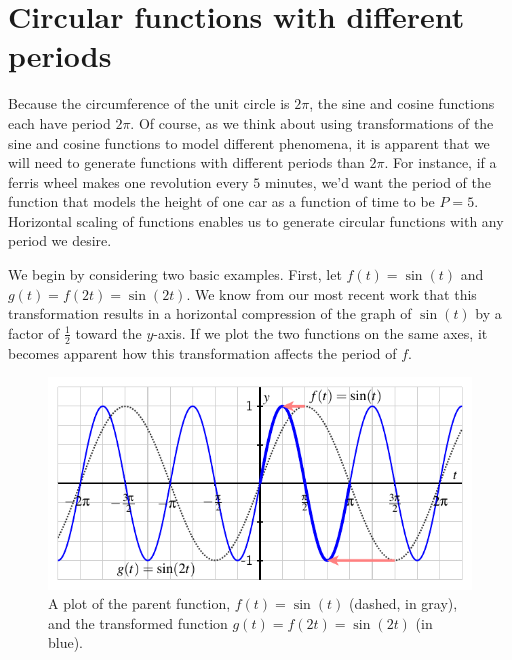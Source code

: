 \documentclass{ximera}
\begin{document}
%
%
%
\section{Circular functions with different periods}

Because the circumference of the unit circle is \(2\pi\), the sine and cosine functions each have period \(2\pi\).  Of course, as we think about using transformations of the sine and cosine functions to model different phenomena, it is apparent that we will need to generate functions with different periods than \(2\pi\).  For instance, if a ferris wheel makes one revolution every \(5\) minutes, we'd want the period of the function that models the height of one car as a function of time to be \(P = 5\).  Horizontal scaling of functions enables us to generate circular functions with any period we desire.%

We begin by considering two basic examples.  First, let \(f(t) = \sin(t)\) and \(g(t) = f(2t) = \sin(2t)\).  We know from our most recent work that this transformation results in a horizontal compression of the graph of \(\sin(t)\) by a factor of \(\frac{1}{2}\) toward the \(y\)-axis.  If we plot the two functions on the same axes, it becomes apparent how this transformation affects the period of \(f\).%
\begin{figure}
\centering
\includegraphics[width=0.75\linewidth]{images/sinusoidal-sine-horiz-scaling}
\caption{A plot of the parent function, \(f(t) = \sin(t)\) (dashed, in gray), and the transformed function \(g(t) = f(2t) = \sin(2t)\) (in blue).\label{F-sinusoidal-sine-compressed}}
\end{figure}
\end{document}
